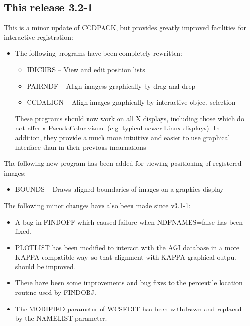 \documentclass[twoside,11pt]{article}
\newcommand{\htmlref}[2]{#1}
\newcommand{\xref}[3]{#1}
\renewcommand{\_}{\texttt{\symbol{95}}}
\newcommand{\xroutine}[1]{\htmlref{{\sc #1}}{#1}}
\begin{document}
\subsection{This release 3.2-1}

  This is a minor update of CCDPACK, but provides greatly
  improved facilities for interactive registration:

  \begin{itemize}
  \item
     The following programs have been completely rewritten:
     \begin{itemize}
     \item \xroutine{IDICURS} -- View and edit position lists
     \item \xroutine{PAIRNDF}  -- 
           Align imagess graphically by drag and drop
     \item \xroutine{CCDALIGN} -- 
           Align images graphically by interactive object selection
     \end{itemize}

     These programs should now work on all X displays, including those
     which do not offer a PseudoColor visual (e.g. typical newer Linux
     displays).  In addition, they provide a much more intuitive and
     easier to use graphical interface than in their previous
     incarnations.
  \end{itemize}

  The following new program has been added for viewing positioning of
  registered images:
  \begin{itemize}
  \item \xroutine{BOUNDS} -- 
        Draws aligned boundaries of images on a graphics display
  \end{itemize}


  The following minor changes have also been made since v3.1-1:
  \begin{itemize}
  \item
     A bug in \xroutine{FINDOFF} which caused failure when NDFNAMES=false has
     been fixed.
  \item
     \xroutine{PLOTLIST} has been modified to interact with the 
     \xref{AGI database}{sun95}{se_agitate}
     in a more \xref{KAPPA}{sun95}{}-compatible way, 
     so that alignment with KAPPA
     graphical output should be improved.
  \item
     There have been some improvements and bug fixes to the percentile
     location routine used by \xroutine{FINDOBJ}.
  \item
     The MODIFIED parameter of \xroutine{WCSEDIT} has been withdrawn and replaced
     by the NAMELIST parameter.
  \end{itemize}
\end{document}
